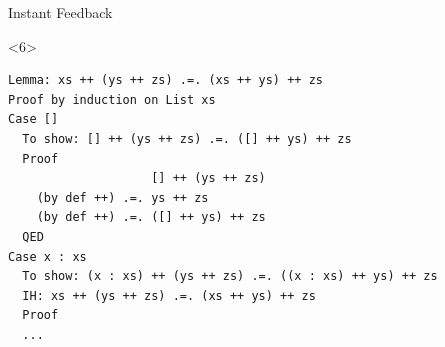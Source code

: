 \documentclass[aspectratio=169]{beamer}
\begin{document}
\begin{frame}[fragile]{Instant Feedback}

\begin{onlyenv}<6>
\begin{lstlisting}
Lemma: xs ++ (ys ++ zs) .=. (xs ++ ys) ++ zs
Proof by induction on List xs
Case []
  To show: [] ++ (ys ++ zs) .=. ([] ++ ys) ++ zs
  Proof
                    [] ++ (ys ++ zs)
    (by def ++) .=. ys ++ zs
    (by def ++) .=. ([] ++ ys) ++ zs
  QED
Case x : xs
  To show: (x : xs) ++ (ys ++ zs) .=. ((x : xs) ++ ys) ++ zs
  IH: xs ++ (ys ++ zs) .=. (xs ++ ys) ++ zs
  Proof
  ...
\end{lstlisting}
\end{onlyenv}

\end{frame}
\end{document}
